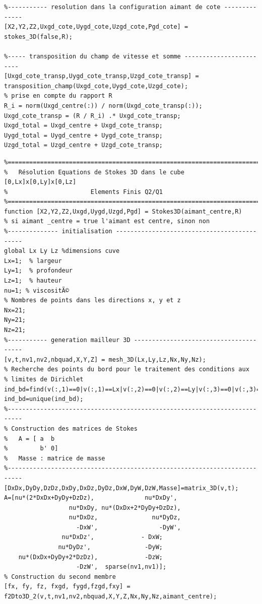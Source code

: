 \documentclass[a4paper,12pt,titlepage]{report}
\begin{document}
\begin{onehalfspace}
\begin{appendix}
\begin{verbatim}
%----------- resolution dans la configuration aimant de cote --------------
[X2,Y2,Z2,Uxgd_cote,Uygd_cote,Uzgd_cote,Pgd_cote] = stokes_3D(false,R);

%----- transposition du champ de vitesse et somme ------------------------
[Uxgd_cote_transp,Uygd_cote_transp,Uzgd_cote_transp] = 
transposition_champ(Uxgd_cote,Uygd_cote,Uzgd_cote);
% prise en compte du rapport R
R_i = norm(Uxgd_centre(:)) / norm(Uxgd_cote_transp(:));
Uxgd_cote_transp = (R / R_i) .* Uxgd_cote_transp;
Uxgd_total = Uxgd_centre + Uxgd_cote_transp;
Uygd_total = Uygd_centre + Uygd_cote_transp;
Uzgd_total = Uzgd_centre + Uzgd_cote_transp;
\end{verbatim}
\begin{verbatim}
%=========================================================================%
% 	Résolution Equations de Stokes 3D dans le cube [0,Lx]x[0,Ly]x[0,Lz]
% 						Elements Finis Q2/Q1
%=========================================================================%
function [X2,Y2,Z2,Uxgd,Uygd,Uzgd,Pgd] = Stokes3D(aimant_centre,R)
% si aimant _centre = true l'aimant est centre, sinon non
%-------------- initialisation --------------------------------------------
global Lx Ly Lz %dimensions cuve
Lx=1;  % largeur
Ly=1;  % profondeur
Lz=1;  % hauteur
nu=1; % viscositÃ©
% Nombres de points dans les directions x, y et z
Nx=21;
Ny=21;
Nz=21;
%----------- generation mailleur 3D ---------------------------------------
[v,t,nv1,nv2,nbquad,X,Y,Z] = mesh_3D(Lx,Ly,Lz,Nx,Ny,Nz);
% Recherche des points du bord pour le traitement des conditions aux 
% limites de Dirichlet
ind_bd=find(v(:,1)==0|v(:,1)==Lx|v(:,2)==0|v(:,2)==Ly|v(:,3)==0|v(:,3)==Lz);
ind_bd=unique(ind_bd);
%--------------------------------------------------------------------------
% Construction des matrices de Stokes 
%   A = [ a  b
%         b' 0]
%   Masse : matrice de masse
%--------------------------------------------------------------------------
[DxDx,DyDy,DzDz,DxDy,DxDz,DyDz,DxW,DyW,DzW,Masse]=matrix_3D(v,t);
A=[nu*(2*DxDx+DyDy+DzDz),              nu*DxDy',              
                  nu*DxDy, nu*(DxDx+2*DyDy+DzDz),                                        
                  nu*DxDz,               nu*DyDz,                            
                    -DxW',                 -DyW',                                  
             	nu*DxDz',             - DxW;
               nu*DyDz',               -DyW;
    nu*(DxDx+DyDy+2*DzDz),             -DzW;
                    -DzW',  sparse(nv1,nv1)];
% Construction du second membre
[fx, fy, fz, fxgd, fygd,fzgd,fxy] = 
f2Dto3D_2(v,t,nv1,nv2,nbquad,X,Y,Z,Nx,Ny,Nz,aimant_centre); 

\end{verbatim}
\end{appendix}
\end{onehalfspace}
\end{document}
